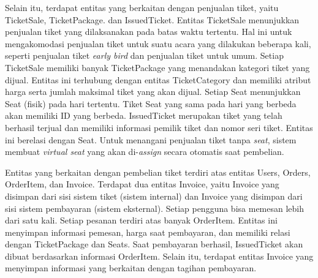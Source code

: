 Selain itu, terdapat entitas yang berkaitan dengan penjualan tiket, yaitu TicketSale, TicketPackage. dan IssuedTicket. Entitas TicketSale menunjukkan penjualan tiket yang dilaksanakan pada batas waktu tertentu. Hal ini untuk mengakomodasi penjualan tiket untuk suatu acara yang dilakukan beberapa kali, seperti penjualan tiket \textit{early bird} dan penjualan tiket untuk umum. Setiap TicketSale memiliki banyak TicketPackage yang menandakan kategori tiket yang dijual. Entitas ini terhubung dengan entitas TicketCategory dan memiliki atribut harga serta jumlah maksimal tiket yang akan dijual. Setiap Seat menunjukkan Seat (fisik) pada hari tertentu. Tiket Seat yang sama pada hari yang berbeda akan memiliki ID yang berbeda. IssuedTicket merupakan tiket yang telah berhasil terjual dan memiliki informasi pemilik tiket dan nomor seri tiket. Entitas ini berelasi dengan Seat. Untuk menangani penjualan tiket tanpa \textit{seat}, sistem membuat \textit{virtual seat} yang akan di-\textit{assign} secara otomatis saat pembelian.

Entitas yang berkaitan dengan pembelian tiket terdiri atas entitas Users, Orders, OrderItem, dan Invoice. Terdapat dua entitas Invoice, yaitu Invoice yang disimpan dari sisi sistem tiket (sistem internal) dan Invoice yang disimpan dari sisi sistem pembayaran (sistem eksternal). Setiap pengguna bisa memesan lebih dari satu kali. Setiap pesanan terdiri atas banyak OrderItem. Entitas ini menyimpan informasi pemesan, harga saat pembayaran, dan memiliki relasi dengan TicketPackage dan Seats. Saat pembayaran berhasil, IssuedTicket akan dibuat berdasarkan informasi OrderItem. Selain itu, terdapat entitas Invoice yang menyimpan informasi yang berkaitan dengan tagihan pembayaran.